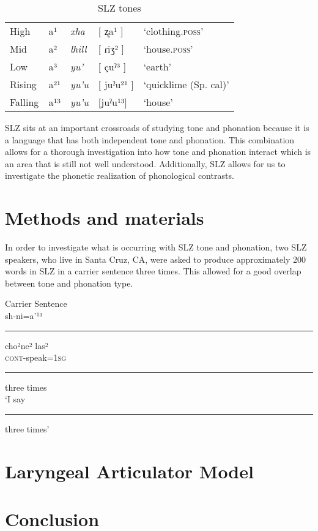 \documentclass[12pt, letterpaper]{article}
\providecommand{\lsptoprule}{\midrule\toprule}
\providecommand{\lspbottomrule}{\bottomrule\midrule}
\begin{document}
\begin{table}[!h]
\centering
\caption{SLZ tones}
\label{tab:tones}
 \begin{tabular}{lllll}
  \lsptoprule
  High   	&  a¹  &  \textit{xha}   &  [ ʐa¹ ] & `clothing.\textsc{poss}'\\
	Mid    	&  a²  &  \textit{lhill} 	& [ ɾiʒ² ] & `house.\textsc{poss}' \\
	Low   	&  a³  &  \textit{yu'} 	&	 [ çuˀ³ ] & `earth'\\
	Rising	&  a²¹  &  \textit{yu'u} 	&	[ juˀu²¹ ] & `quicklime (Sp. cal)' \\
	Falling &  a¹³  &  \textit{yu'u}  &	[juˀu¹³] &	`house' \\
  \lspbottomrule
 \end{tabular}
\end{table}

SLZ sits at an important crossroads of studying tone and phonation because it is a language that has both independent tone and phonation. This combination allows for a thorough investigation into how tone and phonation interact which is an area that is still not well understood. Additionally, SLZ allows for us to investigate the phonetic realization of phonological contrasts. 

\section{Methods and materials} \label{sec:Methods}

In order to investigate what is occurring with SLZ tone and phonation, two SLZ speakers, who live in Santa Cruz, CA, were asked to produce approximately 200 words in SLZ in a carrier sentence three times. This allowed for a good overlap between tone and phonation type. 

\ea Carrier Sentence \label{ex:carrier}\\
\gll sh-ni=a'¹³ \rule{10mm}{1pt} cho²ne² las²\\ 
\textsc{cont}-speak=1\textsc{sg} \rule{10mm}{1pt} three times\\
\trans `I say \rule{10mm}{1pt} three times'	
\z 

\section{Laryngeal Articulator Model} \label{sec:LAM}



\section{Conclusion} \label{sec:Conclusion}




\printbibliography[heading=bibintoc]
\end{document}
